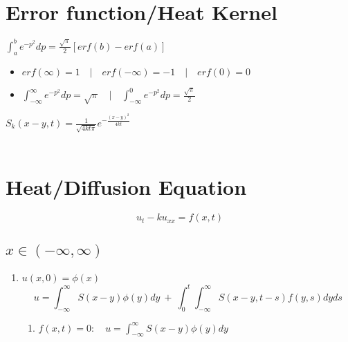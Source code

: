 \documentclass[12pt]{article}
\newcommand\bitalicmath{\mathversion{bitalic}}
\begin{document}
\section{Error function/Heat Kernel}
$\int_{a}^{b} e^{-p^2}dp = \displaystyle\frac{\sqrt{\pi}}{2}[erf(b) - erf(a)]$
\begin{itemize}
	\item $erf(\infty) = 1 \quad|\quad erf(-\infty) = -1 \quad|\quad erf(0) = 0$
	\item $\int_{-\infty}^{\infty} e^{-p^2}dp = \sqrt{\pi} \quad|\quad \int_{-\infty}^{0} e^{-p^2}dp = \displaystyle\frac{\sqrt{\pi}}{2}$ \\
\end{itemize}
$S_k(x-y,t) = \frac{1}{\sqrt{4kt\pi}}e^{-\frac{(x-y)^2}{4kt}}$ \\ \\
\pagebreak

\section{Heat/Diffusion Equation}
\boldmath $$u_t - ku_{xx} = f(x,t)$$ \unboldmath
\subsection{\boldmath $x \in (-\infty, \infty)$ \unboldmath \\}
	\begin{enumerate}
	\item {\bitalicmath $ u(x,0) = \phi(x)$}
	$$u = \displaystyle\int_{-\infty}^{\infty}S(x-y)\phi(y)dy \ +\  \int_{0}^{t}\int_{-\infty}^{\infty}S(x-y,t-s)f(y,s)dyds$$
		\begin{enumerate}
		\item {\boldmath $f(x,t) = 0:$}\  \ $u = \displaystyle\int_{-\infty}^{\infty}S(x-y)\phi(y)dy$ \\
		\end{enumerate}
	\end{enumerate}
\end{document}
